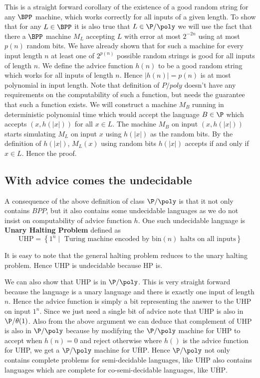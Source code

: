 This is a straight forward corollary of the existence of a good random
string for any $\BPP$ machine, which works correctly for all inputs of
a given length. To show that for any $L\in \BPP$ it is also true that
$L\in \P/\poly$ we will use the fact that there a $\BPP$ machine $M_L$
accepting $L$ with error at most $2^{-2n}$ using at most $p(n)$ random
bits. We have already shown that for such a machine for every input
length $n$ at least one of $2^{p(n)}$ possible random strings is good
for all inputs of length $n$. We define the advice function $h(n)$ to
be a good random string which works for all inputs of length
$n$. Hence $|h(n)|=p(n)$ is at most polynomial in input length. Note
that definition of $P/poly$ doesn't have any requirements on the
computability of such a function, but needs the guarantee that such a
function exists. We will construct a machine $M_B$ running in
deterministic polynomial time which would accept
the language $B \in \P$ which accepts $(x,h(|x|))$ for all $x\in
L$. The machine $M_B$ on input $(x,h(|x|))$ starts simulating $M_L$ on
input $x$ using $h(|x|)$ as the random bits. By the definition of
$h(|x|)$, $M_L(x)$ using random bits $h(|x|)$ accepts if and only if
$x\in L$. Hence the proof.

\subsection{With advice comes the undecidable}

A consequence of the above definition of class $\P/\poly$ is that it not
only contains $BPP$, but it also contains some undecidable languages
as we do not insist on computability of advice function $h$. One such
undecidable language is \textbf{Unary Halting Problem} defined as 
\begin{displaymath}
  \text{UHP} = \left\{   1^n \mid \text{ Turing machine encoded by
      bin}(n) \text{ halts on all inputs}  \right\}
\end{displaymath}

It is easy to note that the general halting problem reduces to the unary
halting problem. Hence UHP is undecidable because HP is. 

We can also show that UHP is in $\P/\poly$. This is very straight
forward because the language is a unary language and there is exactly
one input of length $n$. Hence the advice function is simply a bit
representing the answer to the UHP on input $1^n$. Since we just need
a single bit of advice note that UHP is also in $\P/\theta(1)$. Also
from the above argument we can deduce that complement of UHP is also
in $\P/\poly$ because by modifying the $\P/\poly$ machine for UHP to
accept when $h(n)=0$ and reject otherwise where $h()$ is the advice
function for UHP, we get a $\P/\poly$ machine for
$\overline{\text{UHP}}$. Hence $\P/\poly$ not only contains complete
problems for semi-decidable languages, like UHP also contains
languages which are complete for co-semi-decidable languages, like
$\overline{\text{UHP}}$.


